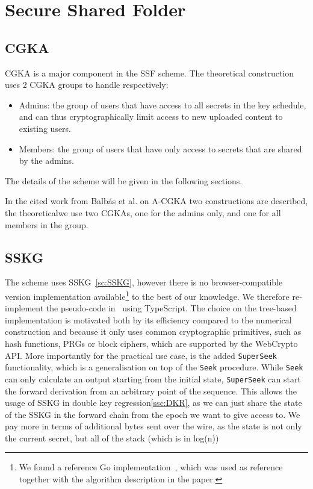 \chapter{Secure Shared Folder}\label{ch:ssf}



\section{CGKA}

CGKA is a major component in the SSF scheme.
The theoretical construction uses 2 CGKA groups to handle respectively:

\begin{itemize}
    \item Admins: the group of users that have access to all secrets in the key schedule, and can thus cryptographically limit access to new uploaded content to existing users.
    \item Members: the group of users that have only access to secrets that are shared by the admins.
\end{itemize}

The details of the scheme will be given in the following sections.

In the cited work from Balb{\'a}s et al. on A-CGKA
two constructions are described, the theoreticalwe use
two CGKAs, one for the admins only,
and one for all members in the group.

\section{SSKG}\label{sc:ssf-sskg}

The scheme uses SSKG~\cref{sc:SSKG}, 
however there is no browser-compatible version implementation available\footnote{We found a reference Go implementation~\cite{SSKGGo}, which was used as reference together with the algorithm description in the paper.}
to the best of our knowledge.
We therefore re-implement the pseudo-code in~\cite{ESORICS:MarPoe14} using TypeScript.
The choice on the tree-based implementation is motivated both by its efficiency
compared to the numerical construction and because it only uses common cryptographic
primitives, such as hash functions, PRGs or block ciphers, which are supported by the WebCrypto API.
More importantly for the practical use case, is the added \texttt{SuperSeek}
functionality, which is a generalisation on top of the \texttt{Seek} procedure.
While \texttt{Seek} can only calculate an output starting from the initial state, 
\texttt{SuperSeek} can start the forward derivation from an arbitrary point of the sequence.
This allows the usage of SSKG in double key regression\cref{ssc:DKR},
as we can just share the state of the SSKG in the forward chain from 
the epoch we want to give access to. 
We pay more in terms of additional bytes sent over the wire, as the state is not only the current secret,
but all of the stack (which is in log(n)) 


